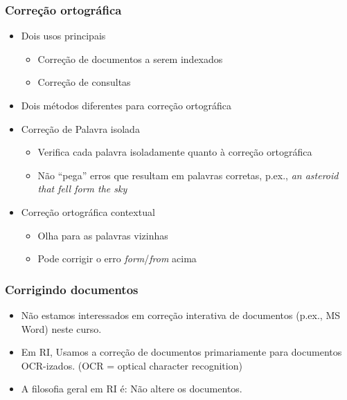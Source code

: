 \documentclass[compress]{beamer}
\begin{document}
\begin{frame}[<+->]
\frametitle{Correção ortográfica}
\pause[2]
\begin{itemize}
\item Dois usos principais
\begin{itemize}
\item Correção de documentos a serem indexados
\item Correção de consultas
\end{itemize}
\item Dois métodos diferentes para correção ortográfica
\item Correção de {\color{blue} Palavra isolada} 
\begin{itemize}
\item Verifica cada palavra isoladamente quanto à correção 
ortográfica
\item Não ``pega'' erros que resultam em palavras corretas, p.ex., \emph{an 
asteroid that fell {\color{blue} form} the sky}
\end{itemize}
\item Correção ortográfica {\color{blue} contextual} 
\begin{itemize}
\item Olha para as palavras vizinhas
\item Pode corrigir o erro \emph{form}/\emph{from} acima
\end{itemize}
\end{itemize}
\end{frame}

\begin{frame}[<+->]
\frametitle{Corrigindo documentos}
\pause[2]
\begin{itemize}
\item Não estamos interessados em correção interativa de documentos
(p.ex., MS Word) neste curso.
\item Em RI, Usamos a correção de documentos primariamente para documentos 
OCR-izados. (OCR = optical character recognition)
\item A filosofia geral em RI é: Não altere os documentos.
\end{itemize}
\end{frame}
\end{document}

